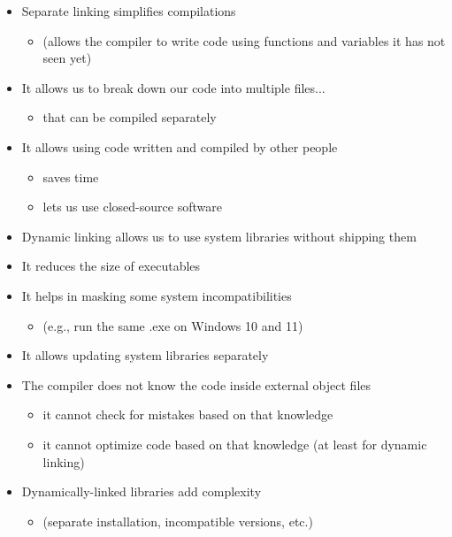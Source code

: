 \documentclass[12pt]{article}
\begin{document}
\begin{itemize}
    \item Separate linking simplifies compilations
    \begin{itemize}
        \item (allows the compiler to write code using functions and variables it has not seen yet)
    \end{itemize}
    \item It allows us to break down our code into multiple files...
    \begin{itemize}
        \item that can be compiled separately
    \end{itemize}
    \item It allows using code written and compiled by other people
    \begin{itemize}
        \item saves time
        \item lets us use closed-source software
    \end{itemize}
    \item Dynamic linking allows us to use system libraries without shipping them
    \item It reduces the size of executables
    \item It helps in masking some system incompatibilities
    \begin{itemize}
        \item (e.g., run the same .exe on Windows 10 and 11)
    \end{itemize}
    \item It allows updating system libraries separately
    \item The compiler does not know the code inside external object files
    \begin{itemize}
        \item it cannot check for mistakes based on that knowledge
        \item it cannot optimize code based on that knowledge (at least for dynamic linking)
    \end{itemize}
    \item Dynamically-linked libraries add complexity
    \begin{itemize}
        \item (separate installation, incompatible versions, etc.)
    \end{itemize}
\end{itemize}
\end{document}
